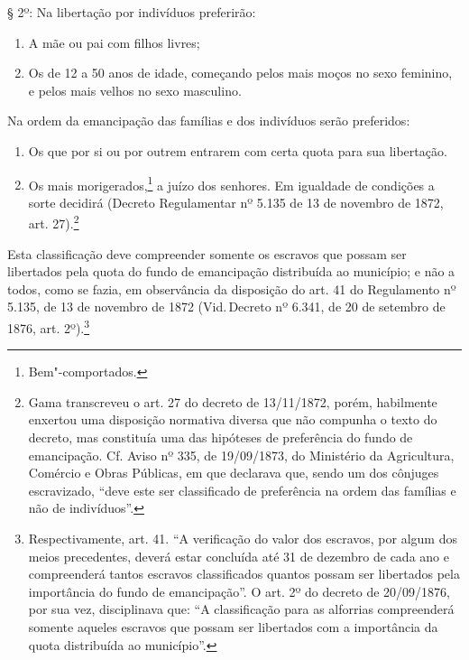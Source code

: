 § 2º: Na libertação por indivíduos preferirão:

\begin{enumerate}[label={\scshape\roman*.}]
\item A mãe ou pai com filhos livres;

\item Os de 12 a 50 anos de idade, começando pelos mais moços no sexo
feminino, e pelos mais velhos no sexo masculino.
\end{enumerate}

Na ordem da emancipação das famílias e dos indivíduos serão preferidos:

\begin{enumerate}[label=\arabic*º]
\item Os que por si ou por outrem entrarem com certa quota para sua
libertação.

\item Os mais morigerados,\footnote{Bem"-comportados.} a juízo dos
senhores. Em igualdade de condições a sorte decidirá (Decreto
Regulamentar nº 5.135 de 13 de novembro de 1872, art. 27).\footnote{
  Gama transcreveu o art. 27 do decreto de 13/11/1872, porém, habilmente
  enxertou uma disposição normativa diversa que não compunha o texto do
  decreto, mas constituía uma das hipóteses de preferência do
  fundo de emancipação. Cf. Aviso nº 335, de 19/09/1873, do Ministério
  da Agricultura, Comércio e Obras Públicas, em que declarava que, sendo
  um dos cônjuges escravizado, ``deve este ser classificado de
  preferência na ordem das famílias e não de indivíduos''.}
\end{enumerate}  

Esta classificação deve compreender somente os escravos que possam ser
libertados pela quota do fundo de emancipação distribuída ao município;
e não a todos, como se fazia, em observância da disposição do art. 41 do
Regulamento nº 5.135, de 13 de novembro de 1872 (Vid.\,Decreto nº 6.341,
de 20 de setembro de 1876, art. 2º).\footnote{Respectivamente, art.
  41. ``A verificação do valor dos escravos, por algum dos meios
  precedentes, deverá estar concluída até 31 de dezembro de cada ano e
  compreenderá tantos escravos classificados quantos possam ser
  libertados pela importância do fundo de emancipação''. O art. 2º do
  decreto de 20/09/1876, por sua vez, disciplinava que: ``A classificação
  para as alforrias compreenderá somente aqueles escravos que possam ser
  libertados com a importância da quota distribuída ao município''.}


